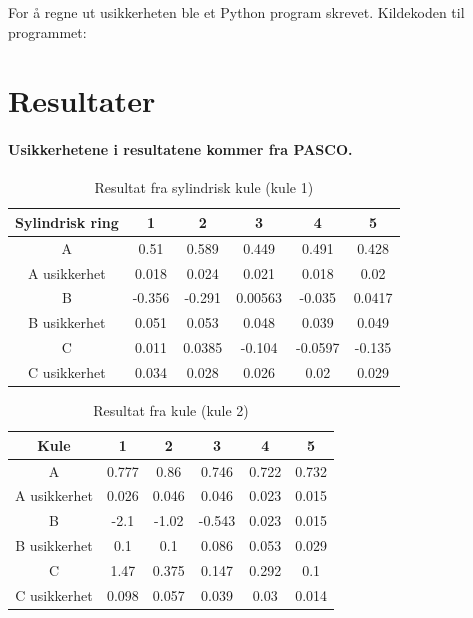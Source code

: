 \documentclass[12pt]{article}
\begin{document}
For å regne ut usikkerheten ble et Python program skrevet. Kildekoden til programmet: \\
\resizebox{17cm}{!}{
    
}

\section{Resultater} \label{sec:res}

\paragraph{Usikkerhetene i resultatene kommer fra PASCO.}

\begin{table}[h]
    \centering
    \begin{tabular}{c|c|c|c|c|c}
        \rowcolor{gray!50}
        Sylindrisk ring & 1 & 2 & 3 & 4 & 5 \\
        \hline
        A & 0.51 & 0.589 & 0.449 & 0.491 & 0.428 \\
        A usikkerhet & 0.018 & 0.024 & 0.021 & 0.018 & 0.02 \\
        B & -0.356 & -0.291 & 0.00563 &	-0.035 & 0.0417 \\
        B usikkerhet & 0.051 & 0.053 & 0.048 & 0.039 & 0.049 \\
        C & 0.011 & 0.0385 & -0.104 & -0.0597 & -0.135 \\
        C usikkerhet & 0.034 & 0.028 & 0.026 & 0.02 & 0.029
    \end{tabular}
    \caption{Resultat fra sylindrisk kule (kule 1)}
    \label{tab:2}
\end{table}

\begin{table}[h]
    \centering
    \begin{tabular}{c|c|c|c|c|c}
        \rowcolor{gray!50}
        Kule & 1 & 2 & 3 & 4 & 5 \\
        \hline
        A & 0.777 & 0.86 & 0.746 & 0.722 & 0.732 \\
        A usikkerhet & 0.026 & 0.046 & 0.046 & 0.023 & 0.015 \\
        B & -2.1 & -1.02 & -0.543 & 0.023 & 0.015 \\
        B usikkerhet & 0.1 & 0.1 & 0.086 & 0.053 & 0.029 \\
        C & 1.47 & 0.375 & 0.147 & 0.292 & 0.1 \\
        C usikkerhet & 0.098 & 0.057 & 0.039 & 0.03	& 0.014
    \end{tabular}
    \caption{Resultat fra kule (kule 2)}
    \label{tab:1}
\end{table}
\end{document}
